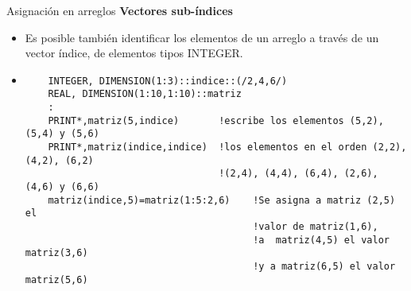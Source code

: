 \begin{frame}[fragile]{Asignación en arreglos}
 \textbf{Vectores sub-índices}
  \begin{itemize}[<+(1)->]
  \item Es posible también identificar los elementos de un arreglo a través de un vector índice, de elementos tipos INTEGER. 
  \vspace{0.15cm}
  \item []
  \begin{verbatim}
    INTEGER, DIMENSION(1:3)::indice::(/2,4,6/)
    REAL, DIMENSION(1:10,1:10)::matriz
    :
    PRINT*,matriz(5,indice)       !escribe los elementos (5,2), (5,4) y (5,6)
    PRINT*,matriz(indice,indice)  !los elementos en el orden (2,2), (4,2), (6,2)
                                  !(2,4), (4,4), (6,4), (2,6), (4,6) y (6,6)
    matriz(indice,5)=matriz(1:5:2,6)    !Se asigna a matriz (2,5) el
                                        !valor de matriz(1,6),
                                        !a  matriz(4,5) el valor matriz(3,6)
                                        !y a matriz(6,5) el valor matriz(5,6)
  \end{verbatim}
 \end{itemize}
\end{frame}